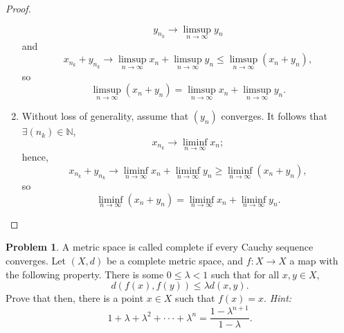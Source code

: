 \documentclass{amsart}
\theoremstyle{definition}
\newtheorem{problem}{Problem}
\begin{document}
\begin{proof}
\begin{enumerate}[label = (\alph*)]
        \[
        y_{n_k} \to \limsup_{n \to \infty}y_n
        \]
        and 
        \[
        x_{n_k} + y_{n_k} \to \limsup_{n \to \infty}x_n + \limsup_{n \to \infty}y_n \leq \limsup_{n \to \infty}(x_n+y_n),
        \]
        so 
        \[
        \limsup_{n \to \infty}(x_n+y_n) = \limsup_{n \to \infty}x_n + \limsup_{n \to \infty}y_n.
        \]
        \item Without loss of generality, assume that $(y_n)$ converges. It follows that $\exists (n_k) \in \mathbb{N}$, 
        \[
        x_{n_k} \to \liminf_{n \to \infty}x_n;
        \]
        hence,
        \[
        x_{n_k} + y_{n_k} \to \liminf_{n \to \infty}x_n + \liminf_{n \to \infty}y_n \geq \liminf_{n \to \infty}(x_n+y_n),
        \]
        so
        \[
        \liminf_{n \to \infty}(x_n+y_n) = \liminf_{n \to \infty}x_n + \liminf_{n \to \infty}y_n.
        \]
    \end{enumerate}
\end{proof}

\begin{problem}
    A metric space is called complete if every Cauchy sequence converges. Let $(X,d)$ be a complete metric space, and $f: X \to X$ a map with the following property. There is some $0 \leq \lambda < 1$ such that for all $x,y \in X$,
    \[
    d(f(x),f(y)) \leq \lambda d(x,y).
    \]
    Prove that then, there is a point $x \in X$ such that $f(x) = x$. \textit{Hint:}
    \[
    1 + \lambda + \lambda^2 + \cdot \cdot \cdot + \lambda^n = \frac{1 - \lambda^{n+1}}{1 - \lambda}.
    \]
\end{problem}
\end{document}
